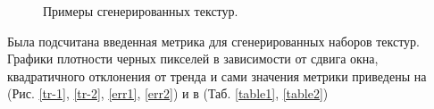\documentclass[a4paper]{article}
\begin{document}
\begin{figure}
\begin{minipage}{0.3\linewidth}
			\end{minipage}
			\hfill
			\begin{minipage}{0.3\linewidth}
			\end{minipage}
			\caption{Примеры сгенерированных текстур.}
			\label{generated}
		\end{figure}
		Была подсчитана введенная метрика для сгенерированных наборов текстур. Графики плотности черных пикселей в зависимости от сдвига окна, квадратичного отклонения от тренда и сами значения метрики приведены на (Рис. \ref{tr-1}, \ref{tr-2}, \ref{err1}, \ref{err2}) и в (Таб. \ref{table1}, \ref{table2})
\end{document}
